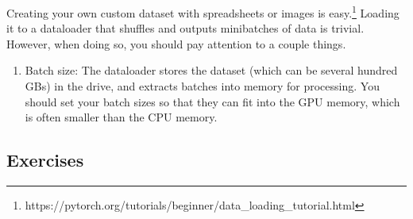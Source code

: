     Creating your own custom dataset with spreadsheets or images is easy.\footnote{https://pytorch.org/tutorials/beginner/data\_loading\_tutorial.html} Loading it to a dataloader that shuffles and outputs minibatches of data is trivial. However, when doing so, you should pay attention to a couple things. 
    \begin{enumerate} 
      \item Batch size: The dataloader stores the dataset (which can be several hundred GBs) in the drive, and extracts batches into memory for processing. You should set your batch sizes so that they can fit into the GPU memory, which is often smaller than the CPU memory. 
    \end{enumerate}

\subsection{Exercises} 

